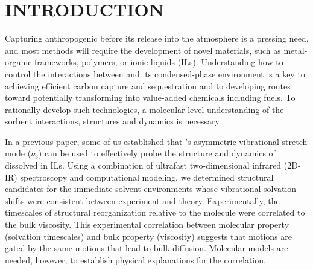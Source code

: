 \documentclass[%
  class = book,%
  crop = false,%
  float = true,%
  multi = true,%
  preview = false,%
]{standalone}
\let\cite\autocite
\newcommand{\caps}[1]{\uppercase{#1}}
\begin{document}
\section{\texorpdfstring{\caps{Introduction}}{Introduction}}
\label{paper_02:sec:I}

Capturing anthropogenic  before its release into the atmosphere is a pressing need, and most methods will require the development of novel materials, such as metal-organic frameworks, polymers, or ionic liquids (ILs).\cite{sumidaCR-12,Du2011,Dawson2011,baraACR-10,seoJPCB-14,DAlessandro2010} Understanding how to control the interactions between  and its condensed-phase environment is a key to achieving efficient carbon capture and sequestration\cite{Corvo2015,Hayes2015,seoJPCB-14,gurkanJPCL-10} and to developing routes toward potentially transforming  into value-added chemicals including fuels.\cite{Grice2015,Rosen2011,Kumar2012} To rationally develop such technologies, a molecular level understanding of the -sorbent interactions, structures and dynamics is necessary.

In a previous paper\cite{Brinzer2015}, some of us established that 's asymmetric vibrational stretch mode (\(\nu_{3}\)) can be used to effectively probe the structure and dynamics of  dissolved in ILs. Using a combination of ultrafast two-dimensional infrared (2D-IR) spectroscopy and computational modeling, we determined structural candidates for the immediate  solvent environments whose vibrational solvation shifts were consistent between experiment and theory. Experimentally, the timescales of structural reorganization relative to the  molecule were correlated to the bulk viscosity. This experimental correlation between molecular property (solvation timescales) and bulk property (viscosity) suggests that  motions are gated by the same motions that lead to bulk diffusion. Molecular models are needed, however, to establish physical explanations for the correlation.
\end{document}
